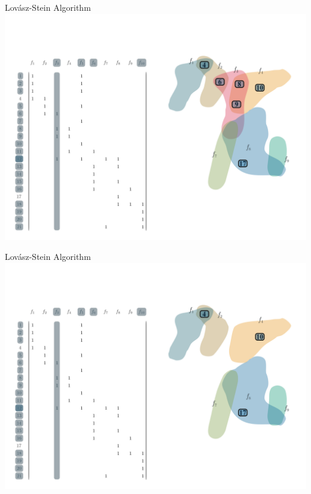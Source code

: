 \documentclass[10pt]{beamer}
\begin{document}
\begin{frame}[fragile]{Lovász-Stein Algorithm}
    \vspace*{-3em}\hspace*{-2em}\includegraphics[width=1.15\textwidth]{Images/LSAExample/09}
\end{frame}

\begin{frame}[fragile]{Lovász-Stein Algorithm}
    \vspace*{-3em}\hspace*{-2em}\includegraphics[width=1.15\textwidth]{Images/LSAExample/10}
\end{frame}
\end{document}
